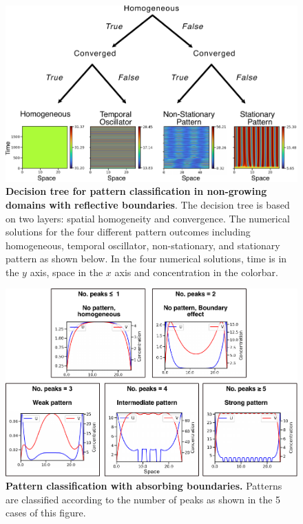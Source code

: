 \documentclass[10pt,letterpaper]{article}
\begin{document}
\begin{figure}[!h]
    \includegraphics[width=1\textwidth]{figures/no_growth_classification}

    \caption{{\bf Decision tree for pattern classification in non-growing domains with reflective boundaries}. The decision tree is based on two layers: spatial homogeneity and convergence. The numerical solutions for the four different pattern outcomes including  homogeneous, temporal oscillator, non-stationary, and stationary pattern as shown below. In the four numerical solutions, time is in the $y$ axis, space in the $x$ axis and concentration in the colorbar.}
    \label{sup_fig2}
\end{figure}


\begin{figure}[!h]
    \includegraphics[width=1\textwidth]{figures/growth_classification}

    \caption{{\bf Pattern classification with absorbing boundaries.} Patterns are classified according to the number of peaks as shown in the 5 cases of this figure.}
    \label{sup_fig3}
\end{figure}
\end{document}

